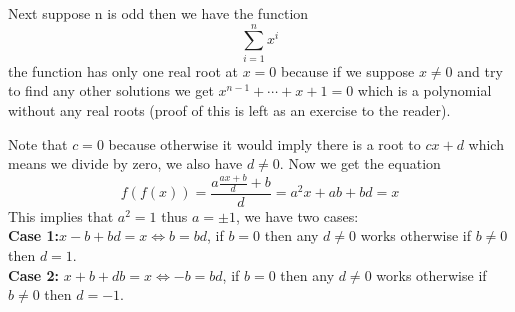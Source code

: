 \begin{problem}
{	Next suppose n is odd then we have the function $$\sum_{i=1}^{n}x^i$$ the function has only one real root at $x=0$ because if we suppose $x\neq0$ and try to find any other solutions we get $x^{n-1}+\cdots+x+1=0$ which is a polynomial without any real roots (proof of this is left as an exercise to the reader).
	}
\end{problem}

\begin{problem}
	Note that $c=0$ because otherwise it would imply there is a root to $cx+d$ which means we divide by zero, we also have $d\neq 0$. Now we get the equation $$f(f(x))=\frac{a\frac{ax+b}{d}+b}{d}=a^2x+ab+bd=x$$
	This implies that $a^2=1$ thus $a=\pm 1$, we have two cases:\\
	\textbf{Case 1:}$x-b+bd=x\iff b=bd$, if $b=0$ then any $d\neq 0$ works otherwise if $b\neq 0$ then $d=1$.\\
	\textbf{Case 2:} $x+b+db=x\iff-b=bd$, if $b=0$ then any $d\neq 0$ works otherwise if $b\neq0$ then $d=-1$.
\end{problem}

